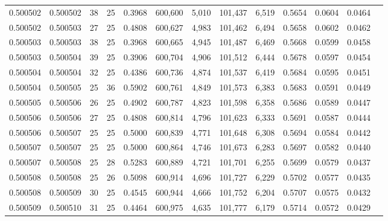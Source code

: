 \begin{tabular}{rrrrrrrrrrrrr}
0.500502 & 0.500502 &    38 &  25 &                                     0.3968 & 600,600 &   5,010 & 101,437 &   6,519 & 0.5654 & 0.0604 & 0.0464 \\
0.500502 & 0.500503 &    27 &  25 &                                     0.4808 & 600,627 &   4,983 & 101,462 &   6,494 & 0.5658 & 0.0602 & 0.0462 \\
0.500503 & 0.500503 &    38 &  25 &                                     0.3968 & 600,665 &   4,945 & 101,487 &   6,469 & 0.5668 & 0.0599 & 0.0458 \\
0.500503 & 0.500504 &    39 &  25 &                                     0.3906 & 600,704 &   4,906 & 101,512 &   6,444 & 0.5678 & 0.0597 & 0.0454 \\
0.500504 & 0.500504 &    32 &  25 &                                     0.4386 & 600,736 &   4,874 & 101,537 &   6,419 & 0.5684 & 0.0595 & 0.0451 \\
0.500504 & 0.500505 &    25 &  36 &                                     0.5902 & 600,761 &   4,849 & 101,573 &   6,383 & 0.5683 & 0.0591 & 0.0449 \\
0.500505 & 0.500506 &    26 &  25 &                                     0.4902 & 600,787 &   4,823 & 101,598 &   6,358 & 0.5686 & 0.0589 & 0.0447 \\
0.500506 & 0.500506 &    27 &  25 &                                     0.4808 & 600,814 &   4,796 & 101,623 &   6,333 & 0.5691 & 0.0587 & 0.0444 \\
0.500506 & 0.500507 &    25 &  25 &                                     0.5000 & 600,839 &   4,771 & 101,648 &   6,308 & 0.5694 & 0.0584 & 0.0442 \\
0.500507 & 0.500507 &    25 &  25 &                                     0.5000 & 600,864 &   4,746 & 101,673 &   6,283 & 0.5697 & 0.0582 & 0.0440 \\
0.500507 & 0.500508 &    25 &  28 &                                     0.5283 & 600,889 &   4,721 & 101,701 &   6,255 & 0.5699 & 0.0579 & 0.0437 \\
0.500508 & 0.500508 &    25 &  26 &                                     0.5098 & 600,914 &   4,696 & 101,727 &   6,229 & 0.5702 & 0.0577 & 0.0435 \\
0.500508 & 0.500509 &    30 &  25 &                                     0.4545 & 600,944 &   4,666 & 101,752 &   6,204 & 0.5707 & 0.0575 & 0.0432 \\
0.500509 & 0.500510 &    31 &  25 &                                     0.4464 & 600,975 &   4,635 & 101,777 &   6,179 & 0.5714 & 0.0572 & 0.0429 \\

\end{tabular}
